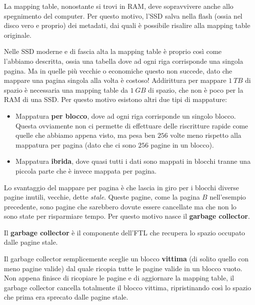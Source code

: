 \documentclass[11pt, a4paper, titlepage, oneside]{scrbook}
\begin{document}
\NB La mapping table, nonostante si trovi in RAM, deve sopravvivere anche allo spegnimento del computer. Per questo motivo, l'SSD salva nella flash (ossia nel disco vero e proprio) dei metadati, dai quali è possibile risalire alla mapping table originale.

Nelle SSD moderne e di fascia alta la mapping table è proprio così come l'abbiamo descritta, ossia una tabella dove ad ogni riga corrisponde una singola pagina. Ma in quelle più vecchie o economiche questo non succede, dato che mappare una pagina singola alla volta è costoso! Addirittura per mappare $\SI{1}{TB}$ di spazio è necessaria una mapping table da $\SI{1}{GB}$ di spazio, che non è poco per la RAM di una SSD. Per questo motivo esistono altri due tipi di mappature:
\begin{itemize}
    \item Mappatura \textbf{per blocco}, dove ad ogni riga corrisponde un singolo blocco. Questa ovviamente non ci permette di effettuare delle riscritture rapide come quelle che abbiamo appena visto, ma pesa ben $256$ volte meno rispetto alla mappatura per pagina (dato che ci sono $256$ pagine in un blocco).
    \item Mappatura \textbf{ibrida}, dove quasi tutti i dati sono mappati in blocchi tranne una piccola parte che è invece mappata per pagina.
\end{itemize} 

Lo svantaggio del mappare per pagina è che lascia in giro per i blocchi diverse pagine inutili, vecchie, dette \textit{stale}. Queste pagine, come la pagina $B$ nell'esempio precedente, sono pagine che sarebbero dovute essere cancellate ma che non lo sono state per risparmiare tempo. Per questo motivo nasce il \textbf{garbage collector}.

\begin{Definizione}
\label{def-garbage-collector}
Il \textbf{garbage collector} è il componente dell'FTL che recupera lo spazio occupato dalle pagine stale.
\end{Definizione}

Il garbage collector semplicemente sceglie un blocco \textbf{vittima} (di solito quello con meno pagine valide) dal quale ricopia tutte le pagine valide in un blocco vuoto. Non appena finisce di ricopiare le pagine e di aggiornare la mapping table, il garbage collector cancella totalmente il blocco vittima, ripristinando così lo spazio che prima era sprecato dalle pagine stale.
\end{document}
